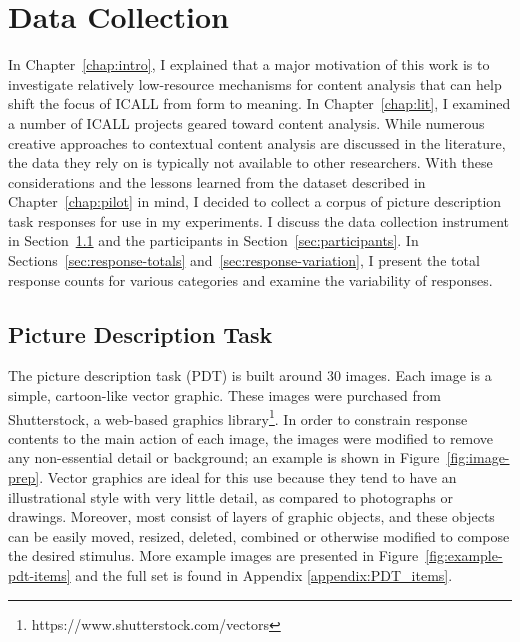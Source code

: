 \chapter{Data Collection}
\label{chap:data}

In Chapter~\ref{chap:intro}, I explained that a major motivation of this work is to investigate relatively low-resource mechanisms for content analysis that can help shift the focus of ICALL from form to meaning. In Chapter~\ref{chap:lit}, I examined a number of ICALL projects geared toward content analysis. While numerous creative approaches to contextual content analysis are discussed in the literature, the data they rely on is typically not available to other researchers. With these considerations and the lessons learned from the dataset described in Chapter~\ref{chap:pilot} in mind, I decided to collect a corpus of picture description task responses for use in my experiments. I discuss the data collection instrument in Section~\ref{sec:pdt} and the participants in Section~\ref{sec:participants}. In Sections~\ref{sec:response-totals} and~\ref{sec:response-variation}, I present the total response counts for various categories and examine the variability of responses.


\section{Picture Description Task}
\label{sec:pdt}


The picture description task (PDT) is built around 30 images. Each image is a simple, cartoon-like vector graphic. These images were purchased from Shutterstock, a web-based graphics library\footnote{https://www.shutterstock.com/vectors}. In order to constrain response contents to the main action of each image, the images were modified to remove any non-essential detail or background; an example is shown in Figure~\ref{fig:image-prep}. Vector graphics are ideal for this use because they tend to have an illustrational style with very little detail, as compared to photographs or drawings. Moreover, most consist of layers of graphic objects, and these objects can be easily moved, resized, deleted, combined or otherwise modified to compose the desired stimulus. More example images are presented in Figure~\ref{fig:example-pdt-items} and the full set is found in Appendix \ref{appendix:PDT_items}.

